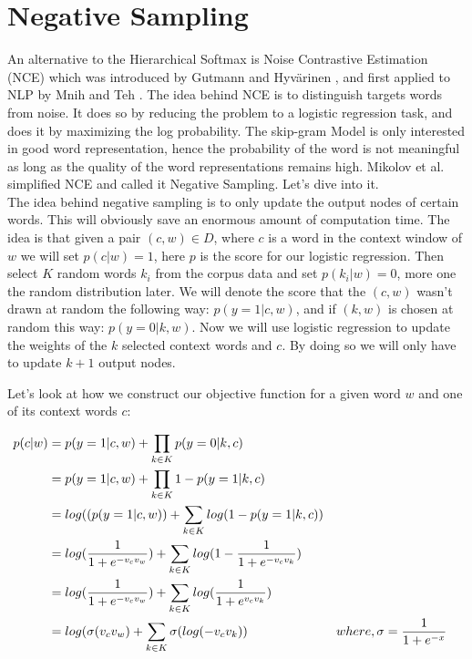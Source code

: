 \section{Negative Sampling}
An alternative to the Hierarchical Softmax is Noise Contrastive Estimation (NCE) which was introduced by Gutmann and Hyv{\"a}rinen \cite{nce-original},  and first applied to NLP by Mnih and Teh \cite{mnih}. The idea behind NCE is to distinguish targets words from noise. It does so by reducing the problem to a logistic regression task, and does it by maximizing the log probability. The skip-gram Model is only interested in good word representation, hence the probability of the word is not meaningful as long as the quality of the word representations remains high. Mikolov et al. \cite{mikolov2} simplified NCE and called it Negative Sampling. Let's dive into it.\\
The idea behind negative sampling is to only update the output nodes of certain words. This will obviously save an enormous amount of computation time. The idea is that given a pair $(c,w) \in D$, where $c$ is a word in the context window of $w$ we will set $p(c|w) =1$, here $p$ is the score for our logistic regression. Then select $K$ random words $k_i$ from the corpus data and set $p(k_i|w) = 0$, more one the random distribution later. We will denote the score that the $(c,w)$ wasn't drawn at random the following way: $p(y=1|c,w)$, and if $(k,w) $ is chosen at random this way: $p(y=0|k,w)$.  Now we will use logistic regression to update the weights of the $k$ selected context words and $c$. By doing so we will only have to update $k+1$ output nodes.

Let's look at how we construct our objective function for a given word $w$ and one of its context words $c$: 

\begin{align*}
p(c|w) &= p(y=1|c,w) + \prod_{k\in K} p(y=0|k,c) 
\\&= p(y=1|c,w) + \prod_{k\in K} 1- p(y=1|k,c) 
\\&= log((p(y=1|c,w)) + \sum_{k\in K} log(1- p(y=1|k,c)) 
\\&=  log(\frac{1}{1+e^{-v_c v_w }})  + \sum_{k\in K} log(1-\frac{1}{1+e^{-v_c v_k}}) 
\\&=  log(\frac{1}{1+e^{-v_c v_w }})  + \sum_{k\in K} log(\frac{1}{1+e^{v_c v_k }})
\\&= log(\sigma(v_c v_w ) + \sum_{k\in K} \sigma(log(-v_c v_k )) &&\text{$ where, \sigma = \frac{1}{1+e^{-x}}$}
\end{align*}

